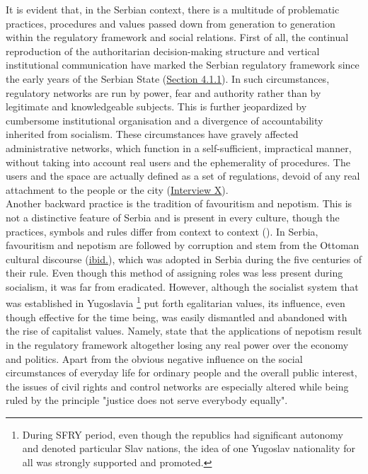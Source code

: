 \documentclass[11pt]{report}
\begin{document}
{{{It is evident that, in the Serbian context, there is a multitude of problematic practices, procedures and values passed down from generation to generation within the regulatory framework and social relations. 
First of all, the continual reproduction of the authoritarian decision-making structure and vertical institutional communication have marked the Serbian regulatory framework since the early years of the Serbian State (\href{Section 4.1.1}{Section 4.1.1}). 
In such circumstances, regulatory networks are run by power, fear and authority rather than by legitimate and knowledgeable subjects. This is further jeopardized by cumbersome institutional organisation and a divergence of accountability inherited from socialism. These circumstances have gravely affected administrative networks, which function in a self-sufficient, impractical manner, without taking into account real users and the ephemerality of procedures. The users and the space are actually defined as a set of regulations, devoid of any real attachment to the people or the city (\href{InterviewX}{Interview X}).
\\

Another backward practice is the tradition of favouritism and nepotism. This is not a distinctive feature of Serbia and is present in every culture, though the practices, symbols and rules differ from context to context (\href{Carikci}{\citealt{carikci_favoritism_2009}}).
In Serbia, favouritism and nepotism are followed by corruption and stem from the Ottoman cultural discourse (\href{Çarikçi}{ibid.}), which was adopted in Serbia during the five centuries of their rule. Even though this method of assigning roles was less present during socialism, it was far from eradicated. However, although the socialist system that was established in Yugoslavia 
\footnote{During SFRY period, even though the republics had significant autonomy and denoted particular Slav nations, the idea of one Yugoslav nationality for all was strongly supported and promoted.}
put forth egalitarian values, its influence, even though effective for the time being, was  easily dismantled and abandoned with the rise of capitalist values.
Namely, \href{Çarikçi}{\cite{carikci_favoritism_2009}} %
state that the applications of nepotism result in the regulatory framework altogether losing any real power over the economy and politics. Apart from the obvious negative influence on the social circumstances of everyday life for ordinary people and the overall public interest, the issues of civil rights and control networks are especially altered while being ruled by the principle "justice does not serve everybody equally".
\\

}}}
\end{document}
